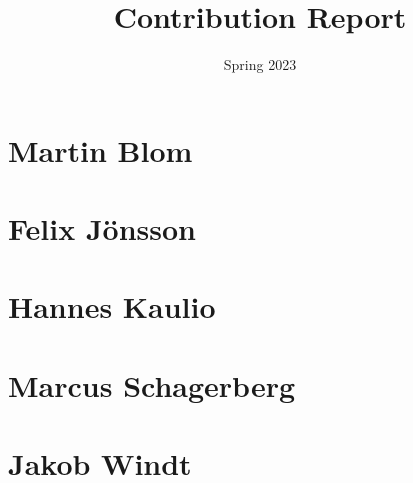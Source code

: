 \documentclass{article}
\title{Contribution Report}
\date{Spring 2023}
\begin{document}
    \maketitle
    \newpage
    \tableofcontents
    \newpage

    \section{Martin Blom}
        

    \clearpage
    \newpage
    \section{Felix Jönsson}
        

    \clearpage
    \newpage
    \section{Hannes Kaulio}
        

    \clearpage
    \newpage
    \section{Marcus Schagerberg}
        

    \clearpage
    \newpage
    \section{Jakob Windt}
        
\end{document}
